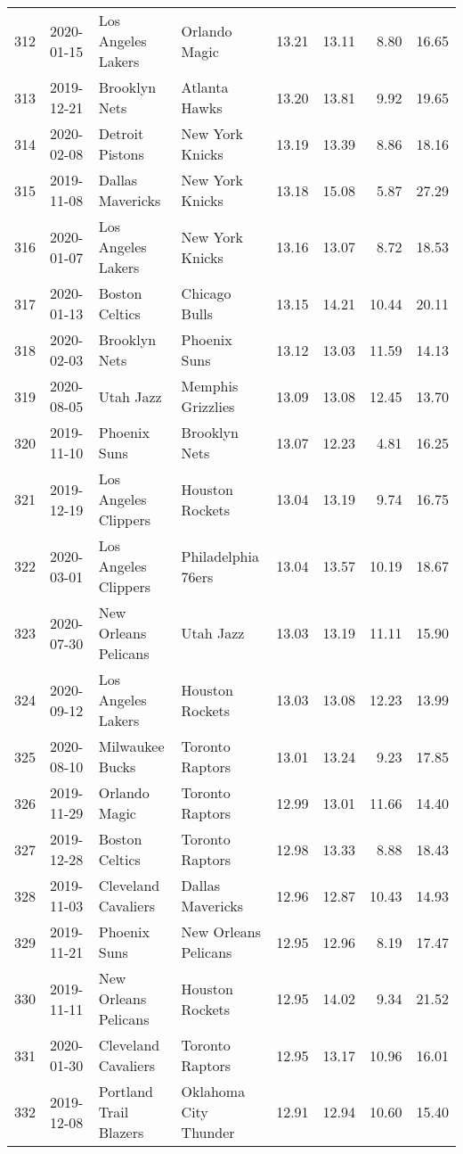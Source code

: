 \documentclass[
  11pt,
]{article}
\theoremstyle{nonumberplain}
\begin{document}
\begin{longtable}{rl|llr|rrr}
312 & 2020-01-15 & Los Angeles Lakers & Orlando Magic & 13.21 & 13.11 & 8.80 & 16.65\\
313 & 2019-12-21 & Brooklyn Nets & Atlanta Hawks & 13.20 & 13.81 & 9.92 & 19.65\\
314 & 2020-02-08 & Detroit Pistons & New York Knicks & 13.19 & 13.39 & 8.86 & 18.16\\
315 & 2019-11-08 & Dallas Mavericks & New York Knicks & 13.18 & 15.08 & 5.87 & 27.29\\
316 & 2020-01-07 & Los Angeles Lakers & New York Knicks & 13.16 & 13.07 & 8.72 & 18.53\\
317 & 2020-01-13 & Boston Celtics & Chicago Bulls & 13.15 & 14.21 & 10.44 & 20.11\\
318 & 2020-02-03 & Brooklyn Nets & Phoenix Suns & 13.12 & 13.03 & 11.59 & 14.13\\
319 & 2020-08-05 & Utah Jazz & Memphis Grizzlies & 13.09 & 13.08 & 12.45 & 13.70\\
320 & 2019-11-10 & Phoenix Suns & Brooklyn Nets & 13.07 & 12.23 & 4.81 & 16.25\\
321 & 2019-12-19 & Los Angeles Clippers & Houston Rockets & 13.04 & 13.19 & 9.74 & 16.75\\
322 & 2020-03-01 & Los Angeles Clippers & Philadelphia 76ers & 13.04 & 13.57 & 10.19 & 18.67\\
323 & 2020-07-30 & New Orleans Pelicans & Utah Jazz & 13.03 & 13.19 & 11.11 & 15.90\\
324 & 2020-09-12 & Los Angeles Lakers & Houston Rockets & 13.03 & 13.08 & 12.23 & 13.99\\
325 & 2020-08-10 & Milwaukee Bucks & Toronto Raptors & 13.01 & 13.24 & 9.23 & 17.85\\
326 & 2019-11-29 & Orlando Magic & Toronto Raptors & 12.99 & 13.01 & 11.66 & 14.40\\
327 & 2019-12-28 & Boston Celtics & Toronto Raptors & 12.98 & 13.33 & 8.88 & 18.43\\
328 & 2019-11-03 & Cleveland Cavaliers & Dallas Mavericks & 12.96 & 12.87 & 10.43 & 14.93\\
329 & 2019-11-21 & Phoenix Suns & New Orleans Pelicans & 12.95 & 12.96 & 8.19 & 17.47\\
330 & 2019-11-11 & New Orleans Pelicans & Houston Rockets & 12.95 & 14.02 & 9.34 & 21.52\\
331 & 2020-01-30 & Cleveland Cavaliers & Toronto Raptors & 12.95 & 13.17 & 10.96 & 16.01\\
332 & 2019-12-08 & Portland Trail Blazers & Oklahoma City Thunder & 12.91 & 12.94 & 10.60 & 15.40\\

\end{longtable}
\end{document}
